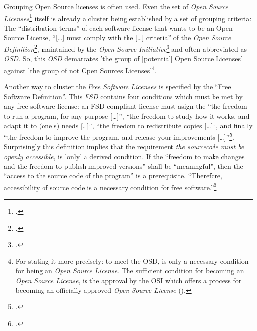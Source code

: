 Grouping Open Source licenses is often used. Even the set of \emph{Open Source
Li\-cen\-ses}\footcite[cf.][\nopage wp]{OSI2012b} itself is already a cluster
being established by a set of grouping criteria: The \enquote{distribution
terms} of each software license that wants to be an Open Source License,
\enquote{[\ldots] must comply with the [\ldots] criteria} of the \emph{Open
Source Definition}\footcite[cf.][\nopage wp]{OSI2012a}, maintained by the
\emph{Open Source Initiative}\footcite[cf.][\nopage wp]{OSI2012c} and often
abbreviated as \emph{OSD}. So, this \emph{OSD} demarcates 'the group of
[potential] Open Source Licenses' against 'the group of not Open Sources
Licenses'\footnote{For stating it more precisely: to meet the OSD, is only a
necessary condition for being an \emph{Open Source License}. The sufficient
condition for becoming an \emph{Open Source License}, is the approval by the
OSI which offers a process for becoming an officially approved \emph{Open
Source License} (\cite[cf.][\nopage wp.]{OSI2012d}).}.

Another way to cluster the \emph{Free Software Licenses} is specified by the
\enquote{Free Software Definition}. This \emph{FSD} contains four conditions
which must be met by any free software license: an FSD compliant license must
asign the \enquote{the freedom to run a program, for any purpose [\ldots]},
\enquote{the freedom to study how it works, and adapt it to (one's) needs
[\ldots]}, \enquote{the freedom to redistribute copies [\ldots]}, and finally
\enquote{the freedom to improve the program, and release your improvements
[\ldots]}\footcite[cf.][41]{Stallman1996a}. Surprisingly this definition
implies that the requirement \emph{the sourcecode must be openly accessible},
is 'only' a derived condition. If the \enquote{freedom to make changes and the
freedom to publish improved versions} shall be \enquote{meaningful}, then the
\enquote{access to the source code of the program} is a prerequisite.
\enquote{Therefore, accessibility of source code is a necessary condition for
free software.}\footcite[cf.][41]{Stallman1996a}

